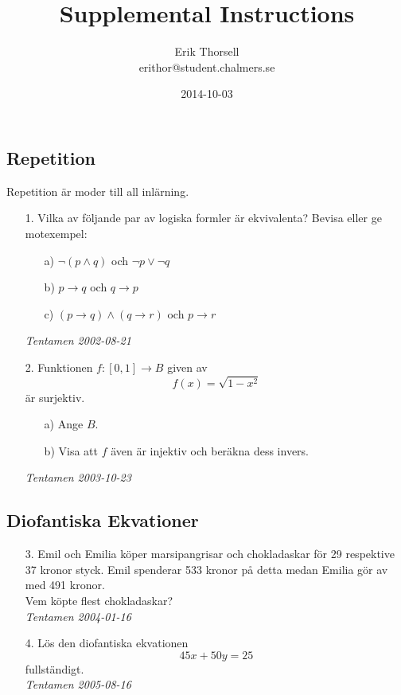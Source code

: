 \documentclass{article}
\title{Supplemental Instructions}
\author{Erik Thorsell \\ 
		\small{erithor@student.chalmers.se}
}
\date{2014-10-03}
\begin{document}
\maketitle


\subsection*{Repetition}
Repetition är moder till all inlärning.
\begin{enumerate}

\item[1.]
Vilka av följande par av logiska formler är ekvivalenta? Bevisa eller ge 
motexempel:
\begin{itemize}
    \item[a) ] $\neg (p \land q)$ och $\neg p \lor \neg q$
    \item[b) ] $p \rightarrow q$ och $q \rightarrow p$
    \item[c) ] $(p \rightarrow q) \land (q \rightarrow r)$ och $p \rightarrow r$
\end{itemize}
{\it Tentamen 2002-08-21}

\item[2.]
Funktionen $f:[0,1] \rightarrow B$ given av $$f(x) = \sqrt{1-x^2}$$ är surjektiv.
\begin{itemize}
    \item[a) ] Ange $B$.
    \item[b) ] Visa att $f$ även är injektiv och beräkna dess invers.
\end{itemize}
{\it Tentamen 2003-10-23}
\end{enumerate}


\subsection*{Diofantiska Ekvationer}
\begin{enumerate}

\item[3.]
Emil och Emilia köper marsipangrisar och chokladaskar för 29 respektive 37 
kronor styck. Emil spenderar 533 kronor på detta medan Emilia gör av med 491 
kronor.\\
Vem köpte flest chokladaskar?\\

{\it Tentamen 2004-01-16}

\item[4.]
Lös den diofantiska ekvationen $$45x+50y=25$$ fullständigt.\\

{\it Tentamen 2005-08-16}
\end{enumerate}
\end{document}
